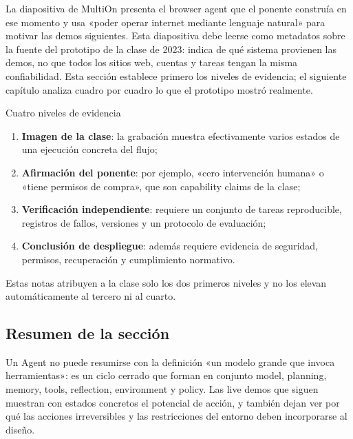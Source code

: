 La diapositiva de MultiOn presenta el browser agent que el ponente construía en ese momento y usa «poder operar internet mediante lenguaje natural» para motivar las demos siguientes. Esta diapositiva debe leerse como metadatos sobre la fuente del prototipo de la clase de 2023: indica de qué sistema provienen las demos, no que todos los sitios web, cuentas y tareas tengan la misma confiabilidad. Esta sección establece primero los niveles de evidencia; el siguiente capítulo analiza cuadro por cuadro lo que el prototipo mostró realmente.


\begin{importantbox}{Cuatro niveles de evidencia}
\begin{enumerate}
  \item \textbf{Imagen de la clase}: la grabación muestra efectivamente varios estados de una ejecución concreta del flujo;
  \item \textbf{Afirmación del ponente}: por ejemplo, «cero intervención humana» o «tiene permisos de compra», que son capability claims de la clase;
  \item \textbf{Verificación independiente}: requiere un conjunto de tareas reproducible, registros de fallos, versiones y un protocolo de evaluación;
  \item \textbf{Conclusión de despliegue}: además requiere evidencia de seguridad, permisos, recuperación y cumplimiento normativo.
\end{enumerate}
Estas notas atribuyen a la clase solo los dos primeros niveles y no los elevan automáticamente al tercero ni al cuarto.
\end{importantbox}

\subsection{Resumen de la sección}

Un Agent no puede resumirse con la definición «un modelo grande que invoca herramientas»: es un ciclo cerrado que forman en conjunto model, planning, memory, tools, reflection, environment y policy. Las live demos que siguen muestran con estados concretos el potencial de acción, y también dejan ver por qué las acciones irreversibles y las restricciones del entorno deben incorporarse al diseño.
